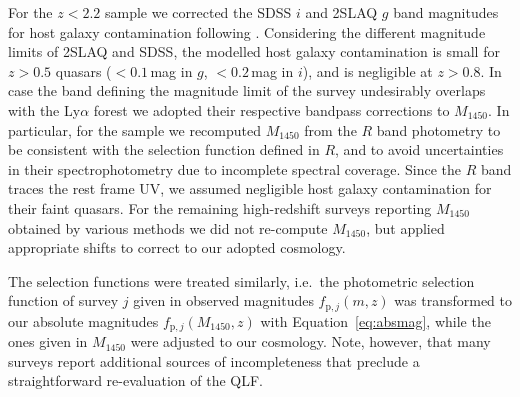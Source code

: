\documentclass[a4paper,fleqn,usenatbib]{mnras}
\begin{document}
For the $z<2.2$ sample we corrected the SDSS $i$ and 2SLAQ $g$ band
magnitudes for host galaxy contamination following
\citet{2009MNRAS.392...19C}. Considering the different magnitude
limits of 2SLAQ and SDSS, the modelled host galaxy contamination is
small for $z>0.5$ quasars ($<0.1$\,mag in $g$, $<0.2$\,mag in $i$),
and is negligible at $z>0.8$.  In case the band defining the magnitude
limit of the survey undesirably overlaps with the Ly$\alpha$ forest
\citep{2010ApJ...710.1498G, 2011ApJ...728L..26G, 2013ApJ...768..105M}
we adopted their respective bandpass corrections to $M_{1450}$. In
particular, for the \citet{2010ApJ...710.1498G, 2011ApJ...728L..26G}
sample we recomputed $M_{1450}$ from the $R$ band photometry to be
consistent with the selection function defined in $R$, and to avoid
uncertainties in their spectrophotometry due to incomplete spectral
coverage. Since the \citet{2010ApJ...710.1498G, 2011ApJ...728L..26G}
$R$ band traces the rest frame UV, we assumed negligible host galaxy
contamination for their faint quasars. For the remaining high-redshift
surveys reporting $M_{1450}$ obtained by various methods
\citep{2010AJ....139..906W, 2015ApJ...798...28K, 2015AA...578A..83G,
  2016ApJ...829...33Y, 2016ApJ...833..222J} we did not re-compute
$M_{1450}$, but applied appropriate shifts to correct to our adopted
cosmology.

The selection functions were treated similarly, i.e.\ the photometric
selection function of survey $j$ given in observed magnitudes
$f_{\mathrm{p},j}\left(m,z\right)$ \citep{2006AJ....131.2766R,
  2009MNRAS.392...19C, 2010ApJ...710.1498G, 2013ApJ...773...14R} was
transformed to our absolute magnitudes
$f_{\mathrm{p},j}\left(M_{1450},z\right)$ with
Equation~\ref{eq:absmag}, while the ones given in $M_{1450}$ were
adjusted to our cosmology. Note, however, that many surveys report
additional sources of incompleteness that preclude a straightforward
re-evaluation of the QLF.
\end{document}
